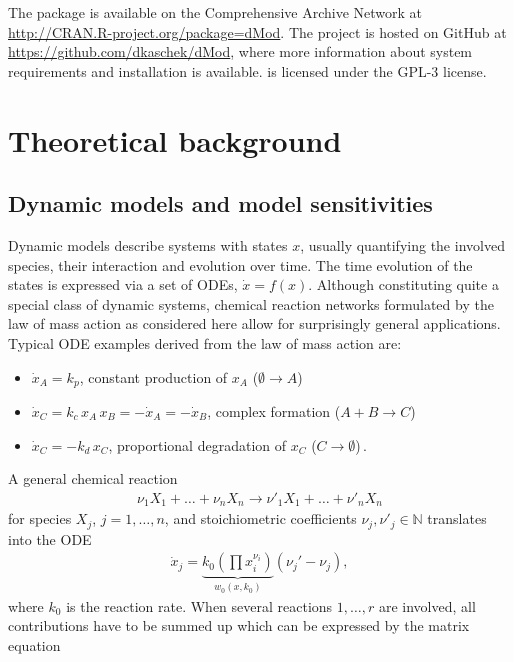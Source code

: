 \documentclass[article]{jss}
\begin{document}
The  package is available on the Comprehensive  Archive Network at \url{http://CRAN.R-project.org/package=dMod}. The project is hosted on GitHub at \url{https://github.com/dkaschek/dMod}, where more information about system requirements and installation is available.  is licensed under the GPL-3 license. 

\vspace*{-0.3cm}

\section{Theoretical background}
\label{sec:theory}

\subsection{Dynamic models and model sensitivities}
Dynamic models describe systems with states $x$, usually quantifying the involved species, their interaction and evolution over time. %
The time evolution of the states is expressed via a set of ODEs, $\dot x = f(x)$. Although constituting quite a special class of dynamic systems, chemical reaction networks formulated by the law of mass action as considered here allow for surprisingly general applications. Typical ODE examples derived from the law of mass action are:
\begin{itemize}
\item $\dot x_A = k_p$, constant production of $x_A$ ($\emptyset \rightarrow A$)
\item $\dot x_C = k_c \,x_A \,x_B = - \dot x_A = - \dot x_B$, complex formation ($A+B \rightarrow C$)
\item $\dot x_C = - k_d \,x_C$, proportional degradation of $x_C$ ($C \rightarrow \emptyset$)\,.
\end{itemize}
A general chemical reaction 
\begin{align}
\nu_1 X_1 + \dots + \nu_n X_n \longrightarrow \nu'_1 X_1 + \dots + \nu'_n X_n
\label{eq:ma_chemical}
\end{align}
for species $X_j$, $j = 1, \dots, n$, and stoichiometric coefficients $\nu_j, \nu'_j\in\mathbb N$ translates into the ODE
\begin{align}
\dot x_j = \underbrace{k_0 \left(\prod x_i^{\nu_i}\right)}_{w_0(x, k_0)} (\nu_j' - \nu_j),
\label{eq:ma}
\end{align}
where $k_0$ is the reaction rate.  When several reactions $1, \dots, r$ are involved, all contributions have to be summed up which can be expressed by the matrix equation
\end{document}
